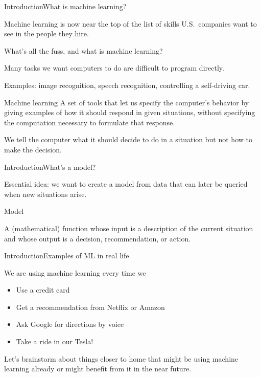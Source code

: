 \documentclass{beamer}
\begin{document}
\begin{frame}{Introduction}{What is machine learning?}

  Machine learning is now near the top of the list of skills
  U.S.\ companies want to see in the people they hire.

  \medskip
  
  What's all the fuss, and what is machine learning?

  \medskip
  
  Many tasks we want computers to do are difficult to program
  directly.

  \medskip
  
  Examples: image recognition, speech recognition, controlling a
  self-driving car.

  \medskip

  \begin{block}{Machine learning}
  A set of tools that let us specify the computer's
  behavior by giving examples of \alert{how} it should respond in
  given situations, \alert{without specifying the computation
    necessary} to formulate that response.
  \end{block}

  \medskip
  
  We tell the computer \alert{what} it should decide to do in a
  situation but not \alert{how} to make the decision.

\end{frame}


\begin{frame}{Introduction}{What's a model?}

  Essential idea: we want to create a \alert{model} from data that can
  later be \alert{queried} when new situations arise.

  \medskip

  \begin{block}{Model}

    A (mathematical) function whose input is a \alert{description of
      the current situation} and whose output is a \alert{decision,
      recommendation, or action}.

  \end{block}

\end{frame}


\begin{frame}{Introduction}{Examples of ML in real life}
  
  We are using machine learning every time we
  \begin{itemize}
  \item Use a credit card
  \item Get a recommendation from Netflix or Amazon
  \item Ask Google for directions by voice
  \item Take a ride in our Tesla!
  \end{itemize}

  \medskip
  
  Let's brainstorm about things closer to home that might be using
  machine learning already or might benefit from it in the near
  future.

\end{frame}
\end{document}
